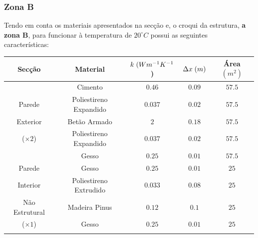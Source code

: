\documentclass[12pt, a4paper]{article}
\begin{document}
\subsubsection{Zona B}\label{ssub:zonab}

Tendo em conta os materiais apresentados na secção e, o croqui da estrutura, \textbf{a zona B}, para funcionar
à temperatura de $ 20^\circ C $ possui as seguintes características:
\newpage
\begin{table}[htpb]
	\begin{center}
		\begin{tabular}{c c c c c}
			\toprule{}
			Secção                     & Material               & $ k \hspace{1mm} (Wm^{-1}K^{-1}$) & $ \Delta x \hspace{1mm} (m)$ & Área $(m^2) $ \\
				\midrule{}

			\multirow{5}{*}{}          & Cimento                & $0.46$                            & $0.09$                       & $57.5$          \\
				\cline{2-5}
			Parede                     & Poliestireno Expandido & $0.037$                           & $0.02$                       & $57.5$          \\
				\cline{2-5}
			Exterior                   & Betão Armado           & $2$                               & $0.18$                       & $57.5$          \\
				\cline{2-5}
			($\times 2$)               & Poliestireno Expandido & $0.037$                           & $0.02$                       & $57.5$          \\
				\cline{2-5}
			                           & Gesso                  & $0.25$                            & $0.01$                       & $57.5$          \\
				\midrule{}

			Parede \multirow{4}{*}{}   & Gesso                  & $0.25$                            & $0.01$                       & $25$          \\
				\cline{2-5}
			Interior                   & Poliestireno Extrudido & $0.033$                           & $0.08$                       & $25$          \\
				\cline{2-5}
			Não Estrutural             & Madeira Pinus          & $0.12$                            & $0.1$                        & $25$          \\
				\cline{2-5}
			($\times 1$)               & Gesso                  & $0.25$                            & $0.01$                       & $25$          \\
				\midrule{}


\end{tabular}
\end{center}
\end{table}
\end{document}
